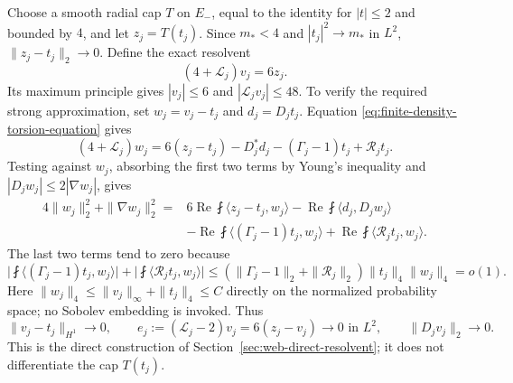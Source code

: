 Choose a smooth radial cap $T$ on $E_-$, equal to the identity for
$|t|\le2$ and bounded by $4$, and let $z_j=T(t_j)$.  Since
$m_*<4$ and $|t_j|^2\to m_*$ in $L^2$,
$\|z_j-t_j\|_2\to0$.  Define the exact resolvent
\begin{equation}
 (4+\mathcal L_j)v_j=6z_j.
 \label{eq:finite-density-direct-resolvent}
\end{equation}
Its maximum principle gives $|v_j|\le6$ and
$|\mathcal L_jv_j|\le48$.  To verify the required strong
approximation, set $w_j=v_j-t_j$ and $d_j=D_jt_j$.  Equation
\eqref{eq:finite-density-torsion-equation} gives
\[
 (4+\mathcal L_j)w_j
 =6(z_j-t_j)-D_j^*d_j-(\Gamma_j-1)t_j+\mathcal R_jt_j.
\]
Testing against $w_j$, absorbing the first two terms by Young's
inequality and $|D_jw_j|\le2|\nabla w_j|$, gives
\begin{align*}
 4\|w_j\|_2^2+\|\nabla w_j\|_2^2
 ={}&6\operatorname{Re}\fint\langle z_j-t_j,w_j\rangle
       -\operatorname{Re}\fint\langle d_j,D_jw_j\rangle\\
 &-\operatorname{Re}\fint\langle(\Gamma_j-1)t_j,w_j\rangle
       +\operatorname{Re}\fint\langle\mathcal R_jt_j,w_j\rangle.
\end{align*}
The last two terms tend to zero because
\[
 \bigl|\fint\langle(\Gamma_j-1)t_j,w_j\rangle\bigr|
 +\bigl|\fint\langle\mathcal R_jt_j,w_j\rangle\bigr|
 \le (\|\Gamma_j-1\|_2+\|\mathcal R_j\|_2)
       \|t_j\|_4\|w_j\|_4=o(1).
\]
Here $\|w_j\|_4\le\|v_j\|_\infty+\|t_j\|_4\le C$ directly on
the normalized probability space; no Sobolev embedding is invoked.
Thus
\begin{equation}
 \|v_j-t_j\|_{H^1}\longrightarrow0,\qquad
 e_j:=(\mathcal L_j-2)v_j=6(z_j-v_j)\longrightarrow0
       \text{ in }L^2,\qquad
 \|D_jv_j\|_2\longrightarrow0.
 \label{eq:finite-density-resolvent-convergence}
\end{equation}
This is the direct construction of
Section~\ref{sec:web-direct-resolvent}; it does not differentiate the
cap $T(t_j)$.

